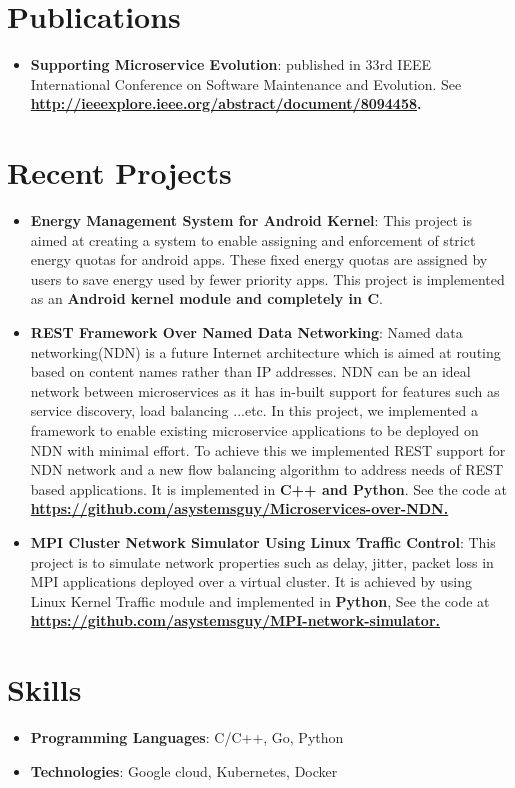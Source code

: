 \documentclass[letterpaper,11pt]{article}
\newcommand{\resumeItem}[2]{
  \item\small{
    \textbf{#1}{: #2 \vspace{-2pt}}
  }
}
\newcommand{\resumeSubItem}[2]{\resumeItem{#1}{#2}\vspace{-4pt}}
\newcommand{\resumeSubHeadingListStart}{\begin{itemize}[leftmargin=*]}
\newcommand{\resumeSubHeadingListEnd}{\end{itemize}}
\begin{document}
\section{Publications}
  \resumeSubHeadingListStart
    \resumeSubItem {Supporting Microservice Evolution} {published in 33rd IEEE International Conference on Software Maintenance and Evolution. 
    See \textbf{\href{http://ieeexplore.ieee.org/abstract/document/8094458}{http://ieeexplore.ieee.org/abstract/document/8094458}.}
    }
  \resumeSubHeadingListEnd

\section{Recent Projects}
  \resumeSubHeadingListStart
    \resumeSubItem{Energy Management System for Android Kernel}
      {This project is aimed at creating a system to enable assigning and enforcement of strict energy quotas for android apps. 
      These fixed energy quotas are assigned by users to save energy used by fewer priority apps.
      This project is implemented as an \textbf{Android kernel module and completely in C}.}
    \resumeSubItem{REST Framework Over Named Data Networking}
      {Named data networking(NDN) is a future Internet architecture which is aimed at routing based on content names rather than IP addresses. 
       NDN can be an ideal network between microservices as it has in-built support for features such as service discovery, load balancing ...etc. 
       In this project, we implemented a framework to enable existing microservice applications to be deployed on NDN with minimal effort.
       To achieve this we implemented REST support for NDN network and a new flow balancing algorithm to address needs of REST based applications.
       It is implemented in \textbf{C++ and Python}. 
       See the code at \textbf{\href{https://github.com/asystemsguy/Microservices-over-NDN}{https://github.com/asystemsguy/Microservices-over-NDN.}}
      }
    \resumeSubItem{MPI Cluster Network Simulator Using Linux Traffic Control}
      {This project is to simulate network properties such as delay, jitter, packet loss in MPI applications deployed over a virtual cluster.
       It is achieved by using Linux Kernel Traffic module and implemented in \textbf{Python}, 
       See the code at \textbf{\href{ https://github.com/asystemsguy/MPI-network-simulator}{https://github.com/asystemsguy/MPI-network-simulator.}}}
 \resumeSubHeadingListEnd


\section{Skills}
  \resumeSubHeadingListStart
    \item{
      \textbf{Programming Languages}{: C/C++, Go, Python }
      \hfill
      }
    \item{
    \textbf{Technologies}{: Google cloud, Kubernetes, Docker}
    }
 \resumeSubHeadingListEnd


\end{document}
